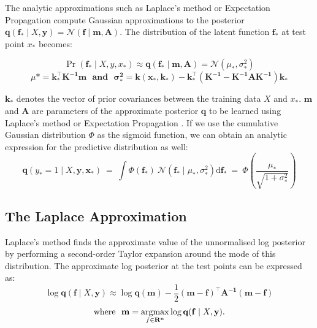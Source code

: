 \documentclass[a4paper,12pt ]{report}
\begin{document}
The analytic approximations such as Laplace's method or Expectation Propagation compute Gaussian approximations to the posterior $\mathbf{q}(\mathbf{f_{*}} \mid X, \mathbf{y}) = \mathcal{N}( \mathbf{f} \mid \mathbf{m}, \mathbf{A})$. The distribution of the latent function $\mathbf{f}_{*}$ at test point $x_{*}$ becomes:

\begin{equation*} \Pr(\mathbf{f_{*}} \mid X, y, x_{*}) \approx \mathbf{q}(\mathbf{f_{*}} \mid \mathbf{m}, \mathbf{A}) = \mathcal{N}(\mu_{*}, \sigma_{*}^{2})  \end{equation*}
\begin{equation*} \mu{*} = \mathbf{k_{*}^{\top} \mathbf{K^{-1}} \mathbf{m} ~~~ \mbox{and} ~~~
\sigma_{*}^{2} = k(x_{*}, k_{*}) - \mathbf{k_{*}^{\top}(\mathbf{K^{-1}} - \mathbf{K^{-1}AK^{-1}})\mathbf{k_{*}} } } \end{equation*}

$\mathbf{k_{*}}$ denotes the vector of prior covariances between the training data $X$ and $x_{*}$. $\mathbf{m}$ and $\mathbf{A}$ are parameters of the approximate posterior $\mathbf{q}$ to be learned using Laplace's method or Expectation Propagation \cite{gpcinference}. If we use the cumulative Gaussian distribution $\Phi$ as the sigmoid function, we can obtain an analytic expression for the predictive distribution as well:
\begin{equation*}  \displaystyle \mathbf{q}(y_{*} = 1 \mid X, \mathbf{y}, \mathbf{x_{*}} ) ~=~ \int{ \Phi(\mathbf{f_{*}}) ~ \mathcal{N}(\mathbf{ f_{*} } \mid \mu_{*}, \sigma_{*}^{2}) \mathrm{d}\mathbf{f_{*}}  ~=~ \Phi \left(\frac{\mu_{*}}{\sqrt{1+\sigma_{*}^{2}}}\right)   }    \end{equation*}

\subsection{The Laplace Approximation}

Laplace's method finds the approximate value of the unnormalised log posterior by performing a second-order Taylor expansion around the mode of this distribution. The approximate log posterior at the test points can be expressed as:
\begin{equation*} \log \mathbf{q}(\mathbf{f} \mid X, \mathbf{y} ) \approx \log \mathbf{q}(\mathbf{m}) - \frac{1}{2} ( \mathbf{m} - \mathbf{f} )^{\top} \mathbf{A^{-1}} ( \mathbf{m} - \mathbf{f} ) \end{equation*}
\begin{equation*} \mbox{where~~} \displaystyle \mathbf{m} = \argmax_{f \in \mathbf{R^n}}{ \log{\mathbf{q}(\mathbf{f} \mid X, \mathbf{y})} }. \end{equation*}
\end{document}
